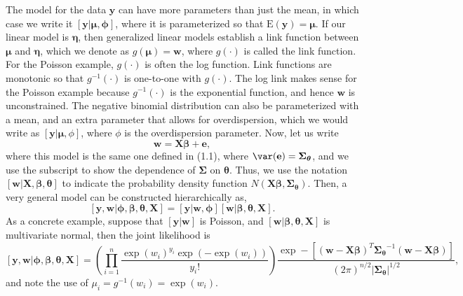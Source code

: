 \documentclass[12pt, titlepage]{article}
\begin{document}
The model for the data $\mathbf{y}$ can have more parameters than just the mean, in which case we write it $[\mathbf{y}|\boldsymbol{\mu},\boldsymbol{\phi}]$, where it is parameterized so that $\textrm{E}(\mathbf{y}) = \boldsymbol{\mu}$.  If our linear model is $\boldsymbol{\eta}$, then generalized linear models establish a link function between $\boldsymbol{\mu}$ and $\boldsymbol{\eta}$, which we denote as $g(\boldsymbol{\mu}) = \mathbf{w}$, where $g(\cdot)$ is called the link function.  For the Poisson example, $g(\cdot)$ is often the log function.  Link functions are monotonic so that $g^{-1}(\cdot)$ is one-to-one with $g(\cdot)$.  The log link makes sense for the Poisson example because $g^{-1}(\cdot)$ is the exponential function, and hence $\mathbf{w}$ is unconstrained. The negative binomial distribution can also be parameterized with a mean, and an extra parameter that allows for overdispersion, which we would write as $[\mathbf{y}|\boldsymbol{\mu},\phi]$, where $\phi$ is the overdispersion parameter.  Now, let us write
$$
\mathbf{w} = \mathbf{X}\boldsymbol{\beta} + \mathbf{e},
$$
where this model is the same one defined in (1.1), where $\var(\mathbf{e}) = \boldsymbol{\Sigma}_{\boldsymbol{\theta}}$, and we use the subscript to show the dependence of $\boldsymbol{\Sigma}$ on $\boldsymbol{\theta}$.  Thus, we use the notation $[\mathbf{w}|\mathbf{X},\boldsymbol{\beta},\boldsymbol{\theta}]$ to indicate the probability density function $N(\mathbf{X}\boldsymbol{\beta},\boldsymbol{\Sigma}_{\boldsymbol{\theta}})$.  Then, a very general model can be constructed hierarchically as,
\begin{equation} \label{eq:hsglm}
[\mathbf{y},\mathbf{w}|\boldsymbol{\phi},\boldsymbol{\beta},\boldsymbol{\theta},\mathbf{X}] = [\mathbf{y}|\mathbf{w},\boldsymbol{\phi}][\mathbf{w}|\boldsymbol{\beta},\boldsymbol{\theta},\mathbf{X}].
\end{equation}
As a concrete example, suppose that $[\mathbf{y}|\mathbf{w}]$ is Poisson, and $[\mathbf{w}|\boldsymbol{\beta},\boldsymbol{\theta},\mathbf{X}]$ is multivariate normal, then the joint likelihood is
$$
[\mathbf{y},\mathbf{w}|\boldsymbol{\phi},\boldsymbol{\beta},\boldsymbol{\theta},\mathbf{X}] = \left(\prod_{i=1}^{n}\frac{\exp(w_{i})^{y_{i}}\exp(-\exp(w_i))}{y_{i}!}\right)\frac{\exp-[(\mathbf{w} - \mathbf{X}\boldsymbol{\beta})^{T}\boldsymbol{\Sigma_{\boldsymbol{\theta}}}^{-1}(\mathbf{w} - \mathbf{X}\boldsymbol{\beta})]}{(2\pi)^{n/2}|\boldsymbol{\Sigma_{\boldsymbol{\theta}}}|^{1/2}},
$$
and note the use of $\mu_{i} = g^{-1}(w_{i}) = \exp(w_{i})$.
\end{document}
